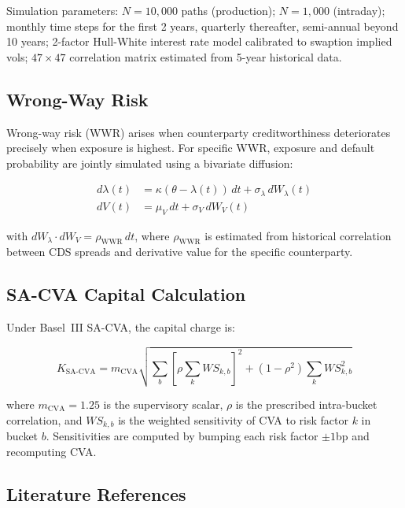 \documentclass[11pt,a4paper]{article}
\begin{document}
Simulation parameters: $N = 10{,}000$ paths (production); $N = 1{,}000$
(intraday); monthly time steps for the first 2 years, quarterly thereafter,
semi-annual beyond 10 years; 2-factor Hull-White interest rate model
calibrated to swaption implied vols; $47 \times 47$ correlation matrix
estimated from 5-year historical data.

\subsection{Wrong-Way Risk}

Wrong-way risk (WWR) arises when counterparty creditworthiness deteriorates
precisely when exposure is highest. For specific WWR, exposure and default
probability are jointly simulated using a bivariate diffusion:

\begin{align}
  d\lambda(t) &= \kappa(\theta - \lambda(t))\, dt + \sigma_\lambda\, dW_\lambda(t)
  \label{eq:wwr_lambda} \\
  dV(t)       &= \mu_V\, dt + \sigma_V\, dW_V(t)
  \label{eq:wwr_v}
\end{align}

with $dW_\lambda \cdot dW_V = \rho_{\text{WWR}}\, dt$, where $\rho_{\text{WWR}}$
is estimated from historical correlation between CDS spreads and derivative
value for the specific counterparty.

\subsection{SA-CVA Capital Calculation}

Under Basel~III SA-CVA, the capital charge is:

\begin{equation}
  K_{\text{SA-CVA}} = m_{\text{CVA}} \sqrt{
    \sum_b \left[\rho \sum_k WS_{k,b}\right]^2
    + (1 - \rho^2) \sum_k WS_{k,b}^2
  }
  \label{eq:sa_cva}
\end{equation}

where $m_{\text{CVA}} = 1.25$ is the supervisory scalar, $\rho$ is the
prescribed intra-bucket correlation, and $WS_{k,b}$ is the weighted
sensitivity of CVA to risk factor $k$ in bucket $b$. Sensitivities are
computed by bumping each risk factor $\pm 1$bp and recomputing CVA.

\subsection{Literature References}
\end{document}
